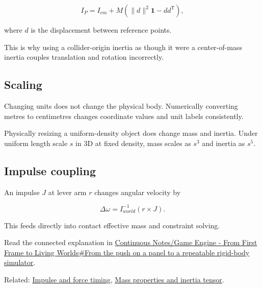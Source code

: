 \[
I_P=
I_{cm}
+
M\left(
\|d\|^2\mathbf{1}-dd^{\mathsf T}
\right),
\]

where \(d\) is the displacement between reference points.

This is why using a collider-origin inertia as though it were a center-of-mass inertia couples translation and rotation incorrectly.

\subsection{Scaling}\label{appendix-66742099f8a0-scaling}

Changing units does not change the physical body. Numerically converting metres to centimetres changes coordinate values and unit labels consistently.

Physically resizing a uniform-density object does change mass and inertia. Under uniform length scale \(s\) in 3D at fixed density, mass scales as \(s^3\) and inertia as \(s^5\).

\subsection{Impulse coupling}\label{appendix-66742099f8a0-impulse-coupling}

An impulse \(J\) at lever arm \(r\) changes angular velocity by

\[
\Delta\omega=I^{-1}_{world}(r\times J).
\]

This feeds directly into contact effective mass and constraint solving.

Read the connected explanation in \hyperref[06-engine-ii-ch034-from-the-push-on-a-panel-to-a-repeatable-rigid-body-simulator]{Continuous Notes/Game Engine - From First Frame to Living Worlds\#From the push on a panel to a repeatable rigid-body simulator}.

Related: \hyperref[appendix-c39931e6e4c2]{Impulse and force timing}, \hyperref[06-engine-ii-ch035-part-1637-composite-body-mass-properties]{Mass properties and inertia tensor}.
